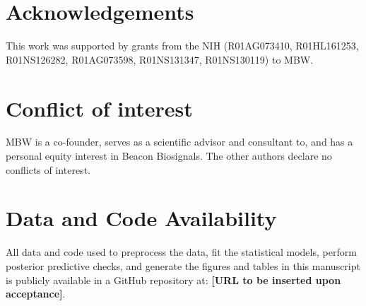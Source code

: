 \section*{Acknowledgements}\label{acknowledgements}

This work was supported by grants from the NIH (R01AG073410, R01HL161253, R01NS126282, R01AG073598, R01NS131347, R01NS130119) to MBW.

\section*{Conflict of interest}

{\label{644442}}

MBW is a co-founder, serves as a scientific advisor and consultant to, and has a personal equity interest in Beacon Biosignals. The other authors declare no conflicts of interest.

\section*{Data and Code Availability}

All data and code used to preprocess the data, fit the statistical models, perform posterior predictive checks, and generate the figures and tables in this manuscript is publicly available in a GitHub repository at: \textbf{[URL to be inserted upon acceptance]}.

